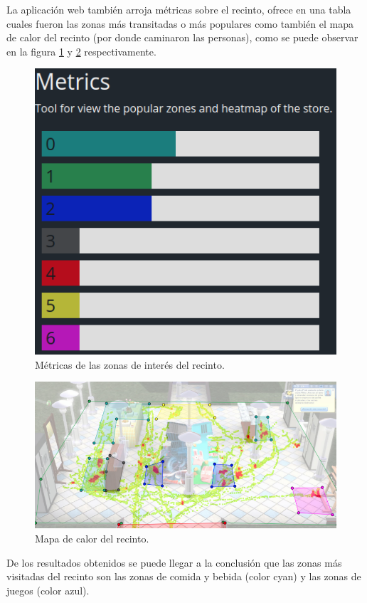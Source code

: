 \newpage

La aplicación web también arroja métricas sobre el recinto, ofrece en una tabla cuales fueron las zonas más transitadas o más populares como también el mapa de calor del recinto (por donde caminaron las personas), como se puede observar en la figura \ref{fig:metricasWebApp} y \ref{fig:metricasWebApp2} respectivamente.

\begin{figure}[ht]
	\centering
	\includegraphics[scale=.60]{./Figures/metricasWebApp.png}
	\caption{Métricas de las zonas de interés del recinto.}
	\label{fig:metricasWebApp}
\end{figure}

\begin{figure}[ht]
	\centering
	\includegraphics[scale=.60]{./Figures/metricasWebApp2.png}
	\caption{Mapa de calor del recinto.}
	\label{fig:metricasWebApp2}
\end{figure}

De los resultados obtenidos se puede llegar a la conclusión que las zonas más visitadas del recinto son las zonas de comida y bebida (color cyan) y las zonas de juegos (color azul).